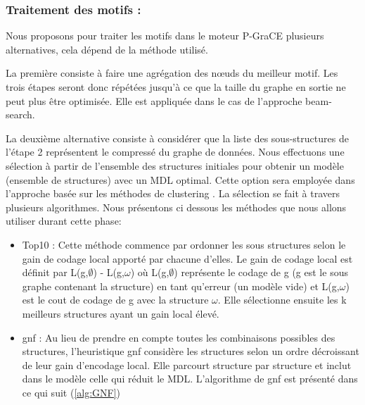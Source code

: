 \documentclass[a4paper,oneside,12pt]{report}
\theoremstyle{definition}
\begin{document}
		   
		\subsubsection{Traitement des motifs :}
		
		Nous proposons pour traiter les motifs dans le moteur P-GraCE plusieurs alternatives, cela dépend de la méthode utilisé.
		
La première consiste à faire une agrégation des nœuds du meilleur motif. Les trois étapes seront donc répétées jusqu'à ce que la taille du graphe en sortie ne peut plus être optimisée. Elle est appliquée dans le cas de l'approche beam-search.

 La deuxième alternative consiste à considérer que  la liste des sous-structures de l'étape 2 représentent le compressé du graphe de données. Nous effectuons une sélection à partir de l'ensemble des structures initiales pour obtenir un modèle (ensemble de structures) avec un MDL optimal. Cette option sera employée dans  l'approche basée sur les méthodes de clustering . La sélection se fait à travers plusieurs algorithmes. Nous présentons ci dessous les méthodes que nous allons utiliser durant cette phase:
\begin{itemize}
\item Top10 : Cette méthode commence par ordonner les sous structures selon le gain de codage local apporté par chacune d'elles. Le gain de codage local est définit par L(g,$\emptyset$) - L(g,$\omega$) où L(g,$\emptyset$) représente le codage de g (g est le sous graphe contenant la structure) en tant qu'erreur (un modèle vide) et L(g,$\omega$) est le cout de codage de g avec la structure $\omega$. Elle sélectionne ensuite les k meilleurs structures ayant un gain local élevé. 
\item \gls{gnf} : Au lieu de prendre en compte toutes les combinaisons possibles des structures, l'heuristique 
\gls{gnf}
 considère les structures selon un ordre décroissant de leur gain d'encodage local. Elle parcourt structure par structure et inclut dans le modèle celle qui réduit le MDL. L'algorithme de \gls{gnf} est présenté dans ce qui suit (\ref{alg:GNF})   

\end{itemize}
\end{document}
